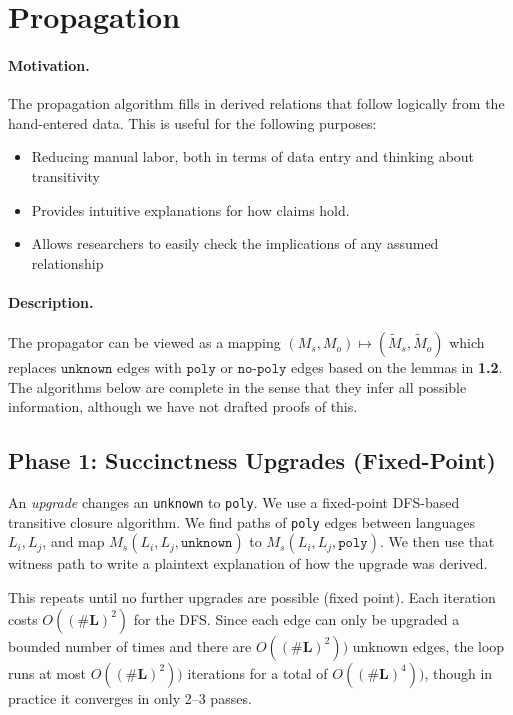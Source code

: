 \documentclass[10pt]{article}
\theoremstyle{plain}
\theoremstyle{definition}
\theoremstyle{remark}
\begin{document}
\section{Propagation}

\paragraph{Motivation.} The propagation algorithm fills in derived relations that follow logically from the hand-entered data. This is useful for the following purposes:
\begin{itemize}
    \item{Reducing manual labor, both in terms of data entry and thinking about transitivity}
    \item{Provides intuitive explanations for how claims hold.}
    \item{Allows researchers to easily check the implications of any assumed relationship}
\end{itemize}

\paragraph{Description.} The propagator can be viewed as a mapping $(M_s, M_o) \mapsto (\widetilde M_s, \widetilde M_o)$ which replaces $\texttt{unknown}$ edges with $\texttt{poly}$ or $\texttt{no-poly}$ edges based on the lemmas in \textbf{1.2}. The algorithms below are complete in the sense that they infer all possible information, although we have not drafted proofs of this.

\subsection{Phase 1: Succinctness Upgrades (Fixed-Point)}

An \emph{upgrade} changes an \texttt{unknown} to \texttt{poly}. We use a fixed-point DFS-based transitive closure algorithm. We find paths of \texttt{poly} edges between languages $L_i, L_j$, and map $M_s(L_i, L_j, \texttt{unknown})$ to $M_s(L_i, L_j, \texttt{poly})$. We then use that witness path to write a plaintext explanation of how the upgrade was derived.

This repeats until no further upgrades are possible (fixed point). Each iteration costs $O((\#\textbf{L})^2)$ for the DFS. Since each edge can only be upgraded a bounded number of times and there are $O((\#\textbf{L})^2))$ unknown edges, the loop runs at most $O((\#\textbf{L})^2))$ iterations for a total of $O((\#\textbf{L})^4))$, though in practice it converges in only 2--3 passes.
\end{document}
